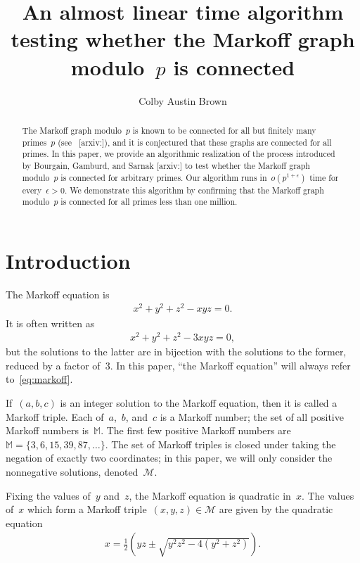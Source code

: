 \documentclass{article}
\title{An almost linear time algorithm testing whether the Markoff graph modulo~$p$ is connected}
\author{Colby Austin Brown}
\date{}
\theoremstyle{definition}
\theoremstyle{remark}
\begin{document}
\maketitle

\begin{abstract}
    The Markoff graph modulo~$p$ is known to be connected for all but finitely many primes~$p$ (see~\citeauthor{fuchs} [arxiv:]), and it is conjectured that these graphs are connected for all primes.
    In this paper, we provide an algorithmic realization of the process introduced by Bourgain, Gamburd, and Sarnak [arxiv:] to test whether the Markoff graph modulo~$p$ is connected for arbitrary primes.
    Our algorithm runs in~$o(p^{1 + \epsilon})$ time for every~$\epsilon > 0$.
    We demonstrate this algorithm by confirming that the Markoff graph modulo~$p$ is connected for all primes less than one million.
\end{abstract}

\section{Introduction}

The Markoff equation is
\begin{align}
    x^2 + y^2 + z^2 - xyz = 0. \label{eq:markoff}
\end{align}
It is often written as
\begin{align*}
    x^2 + y^2 + z^2 - 3xyz = 0,
\end{align*}
but the solutions to the latter are in bijection with the solutions to the former, reduced by a factor of~$3$.
In this paper, ``the Markoff equation'' will always refer to~\eqref{eq:markoff}.

If~$(a, b, c)$ is an integer solution to the Markoff equation, then it is called a Markoff triple.
Each of~$a$,~$b$, and~$c$ is a Markoff number; the set of all positive Markoff numbers is~$\mathbb{M}$.
The first few positive Markoff numbers are~$\mathbb{M} = \{3, 6, 15, 39, 87, \ldots\}$.
The set of Markoff triples is closed under taking the negation of exactly two coordinates; in this paper, we will only consider the nonnegative solutions, denoted~$\mathcal{M}$.

Fixing the values of~$y$ and~$z$, the Markoff equation is quadratic in~$x$.
The values of~$x$ which form a Markoff triple~$(x, y, z) \in \mathcal{M}$ are given by the quadratic equation
\begin{align}
        x = \frac{1}{2}\left(yz \pm \sqrt{y^2z^2 - 4(y^2 + z^2)}\right). \label{eq:quadratic}
\end{align}
\end{document}
